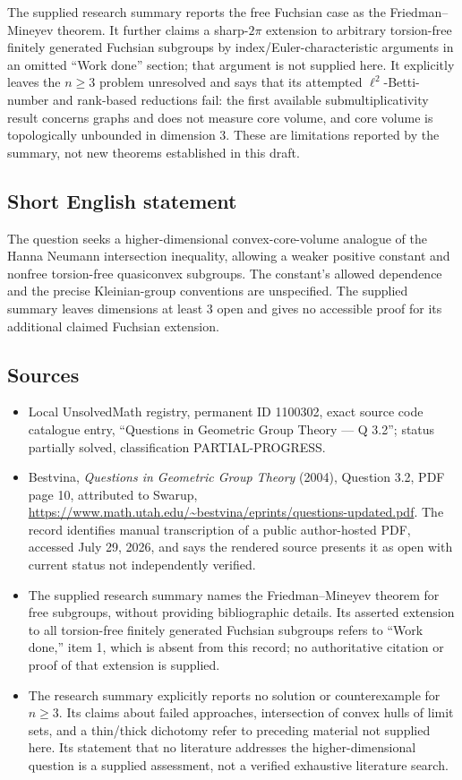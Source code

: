 \documentclass[11pt]{article}
\begin{document}
The supplied research summary reports the free Fuchsian case as the Friedman--Mineyev theorem. It further claims a sharp-$2\pi$ extension to arbitrary torsion-free finitely generated Fuchsian subgroups by index/Euler-characteristic arguments in an omitted ``Work done'' section; that argument is not supplied here. It explicitly leaves the $n\geq3$ problem unresolved and says that its attempted $\ell^2$-Betti-number and rank-based reductions fail: the first available submultiplicativity result concerns graphs and does not measure core volume, and core volume is topologically unbounded in dimension $3$. These are limitations reported by the summary, not new theorems established in this draft.
\subsection{Short English statement}
The question seeks a higher-dimensional convex-core-volume analogue of the Hanna Neumann intersection inequality, allowing a weaker positive constant and nonfree torsion-free quasiconvex subgroups. The constant's allowed dependence and the precise Kleinian-group conventions are unspecified. The supplied summary leaves dimensions at least $3$ open and gives no accessible proof for its additional claimed Fuchsian extension.
\subsection{Sources}
\begin{itemize}
\item Local UnsolvedMath registry, permanent ID 1100302, exact source code catalogue entry, ``Questions in Geometric Group Theory --- Q 3.2''; status partially solved, classification PARTIAL-PROGRESS.
\item Bestvina, \emph{Questions in Geometric Group Theory} (2004), Question 3.2, PDF page 10, attributed to Swarup, \url{https://www.math.utah.edu/~bestvina/eprints/questions-updated.pdf}. The record identifies manual transcription of a public author-hosted PDF, accessed July 29, 2026, and says the rendered source presents it as open with current status not independently verified.
\item The supplied research summary names the Friedman--Mineyev theorem for free subgroups, without providing bibliographic details. Its asserted extension to all torsion-free finitely generated Fuchsian subgroups refers to ``Work done,'' item 1, which is absent from this record; no authoritative citation or proof of that extension is supplied.
\item The research summary explicitly reports no solution or counterexample for $n\geq3$. Its claims about failed approaches, intersection of convex hulls of limit sets, and a thin/thick dichotomy refer to preceding material not supplied here. Its statement that no literature addresses the higher-dimensional question is a supplied assessment, not a verified exhaustive literature search.
\end{itemize}
\end{document}
